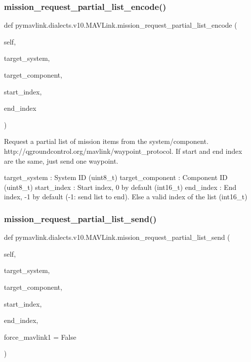 \begin{DoxyVerb}
\begin{DoxyVerb}
\begin{DoxyVerb}
\begin{DoxyVerb}
\subsubsection{\texorpdfstring{mission\+\_\+request\+\_\+partial\+\_\+list\+\_\+encode()}{mission\_request\_partial\_list\_encode()}}
{\footnotesize\ttfamily def pymavlink.\+dialects.\+v10.\+M\+A\+V\+Link.\+mission\+\_\+request\+\_\+partial\+\_\+list\+\_\+encode (\begin{DoxyParamCaption}\item[{}]{self,  }\item[{}]{target\+\_\+system,  }\item[{}]{target\+\_\+component,  }\item[{}]{start\+\_\+index,  }\item[{}]{end\+\_\+index }\end{DoxyParamCaption})}

\begin{DoxyVerb}Request a partial list of mission items from the system/component.
http://qgroundcontrol.org/mavlink/waypoint_protocol.
If start and end index are the same, just send one
waypoint.

target_system             : System ID (uint8_t)
target_component          : Component ID (uint8_t)
start_index               : Start index, 0 by default (int16_t)
end_index                 : End index, -1 by default (-1: send list to end). Else a valid index of the list (int16_t)\end{DoxyVerb}
 \mbox{\label{classpymavlink_1_1dialects_1_1v10_1_1MAVLink_a14b1fe202d9709496e1e3f6062950bd9}} 
\subsubsection{\texorpdfstring{mission\+\_\+request\+\_\+partial\+\_\+list\+\_\+send()}{mission\_request\_partial\_list\_send()}}
{\footnotesize\ttfamily def pymavlink.\+dialects.\+v10.\+M\+A\+V\+Link.\+mission\+\_\+request\+\_\+partial\+\_\+list\+\_\+send (\begin{DoxyParamCaption}\item[{}]{self,  }\item[{}]{target\+\_\+system,  }\item[{}]{target\+\_\+component,  }\item[{}]{start\+\_\+index,  }\item[{}]{end\+\_\+index,  }\item[{}]{force\+\_\+mavlink1 = {\ttfamily False} }\end{DoxyParamCaption})}


\end{DoxyVerb}
\end{DoxyVerb}
\end{DoxyVerb}
\end{DoxyVerb}
